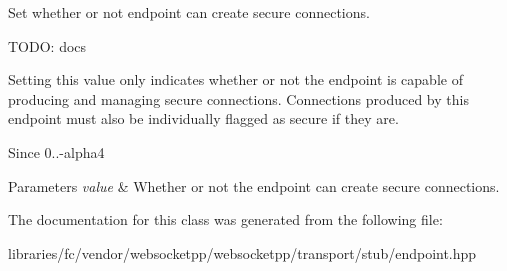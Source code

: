 Set whether or not endpoint can create secure connections. 

T\+O\+DO\+: docs

Setting this value only indicates whether or not the endpoint is capable of producing and managing secure connections. Connections produced by this endpoint must also be individually flagged as secure if they are.

\begin{DoxySince}{Since}
0..-\/alpha4
\end{DoxySince}

\begin{DoxyParams}{Parameters}
{\em value} & Whether or not the endpoint can create secure connections. \\
\hline
\end{DoxyParams}


The documentation for this class was generated from the following file\+:\begin{DoxyCompactItemize}
\item 
libraries/fc/vendor/websocketpp/websocketpp/transport/stub/endpoint.\+hpp\end{DoxyCompactItemize}
